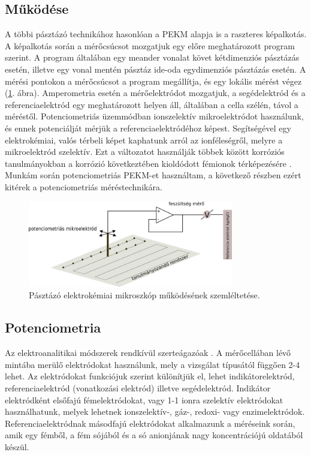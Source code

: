 \subsection{Működése}

A többi pásztázó technikához hasonlóan a PEKM alapja is a raszteres képalkotás. A képalkotás során a mérőcsúcsot mozgatjuk egy előre meghatározott program szerint. A program általában egy meander vonalat követ kétdimenziós pásztázás esetén, illetve egy vonal mentén pásztáz ide-oda egydimenziós pásztázás esetén. A mérési pontokon a mérőcsúcsot a program megállítja, és egy lokális mérést végez (\ref{fig:PEKM}. ábra). Amperometria esetén a mérőelektródot mozgatjuk, a segédelektród és a referenciaelektród egy meghatározott helyen áll, általában a cella szélén, távol a méréstől. Potenciometriás üzemmódban ionszelektív mikroelektródot használunk, és ennek potenciálját mérjük a referenciaelektródéhoz képest. Segítségével egy elektrokémiai, valós térbeli képet kaphatunk arról az ionféleségről, melyre a mikroelektród szelektív. Ezt a változatot használják többek között korróziós tanulmányokban a korrózió következtében kioldódott fémionok térképezésére \cite{bastos2010micropotentiometric, lamaka2008monitoring, karavai2010localized}. Munkám során potenciometriás PEKM-et használtam, a következő részben ezért kitérek a potenciometriás méréstechnikára.
\begin{figure}[!h]
\centering
\includegraphics[width=0.8\textwidth]{img/PEKM.png}
\caption{Pásztázó elektrokémiai mikroszkóp működésének szemléltetése.}
\label{fig:PEKM}
\end{figure}


\subsection{Potenciometria} 

Az elektroanalitikai módszerek rendkívül szerteágazóak \cite{erdey1967, pfreisich1960, kissl1997}. A mérőcellában lévő mintába merülő elektródokat használunk, mely a vizsgálat típusától függően 2-4 lehet. Az elektródokat funkciójuk szerint különítjük el, lehet indikátorelektród, referenciaelektród (vonatkozási elektród) illetve segédelektród. Indikátor elektródként elsőfajú fémelektródokat, vagy 1-1 ionra szelektív elektródokat használhatunk, melyek lehetnek ionszelektív-, gáz-, redoxi- vagy enzimelektródok. Referenciaelektródnak másodfajú elektródokat alkalmazunk a méréseink során, amik egy fémből, a fém sójából és a só anionjának nagy koncentrációjú oldatából készül.

